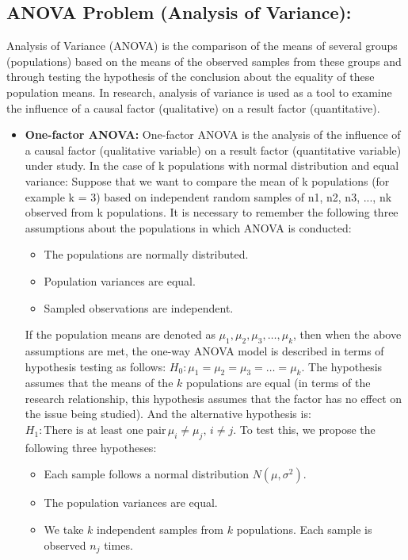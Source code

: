 \documentclass{article}
\begin{document}
	\subsection{ANOVA Problem (Analysis of Variance):}
	Analysis of Variance (ANOVA) is the comparison of the means of several groups (populations) based on the means of the observed samples from these groups and through testing the hypothesis of the conclusion about the equality of these population means. In research, analysis of variance is used as a tool to examine the influence of a causal factor (qualitative) on a result factor (quantitative).
	\begin{itemize}
		\item 
		\textbf{One-factor ANOVA:} One-factor ANOVA is the analysis of the influence of a causal factor (qualitative variable) on a result factor (quantitative variable) under study. In the case of k populations with normal distribution and equal variance: Suppose that we want to compare the mean of k populations (for example k = 3) based on independent random samples of n1, n2, n3, ..., nk observed from k populations. It is necessary to remember the following three assumptions about the populations in which ANOVA is conducted:
		\begin{itemize}
			\item The populations are normally distributed.
			\item Population variances are equal.
			\item Sampled observations are independent.
		\end{itemize}
		If the population means are denoted as \(\mu_1, \mu_2, \mu_3, \ldots, \mu_k\), then when the above assumptions are met, the one-way ANOVA model is described in terms of hypothesis testing as follows: \(H_0: \mu_1 = \mu_2 = \mu_3 = \ldots = \mu_k\). The hypothesis assumes that the means of the \(k\) populations are equal (in terms of the research relationship, this hypothesis assumes that the factor has no effect on the issue being studied). And the alternative hypothesis is: \(H_1: \text{There is at least one pair} \, \mu_i \neq \mu_j, \, i \neq j\). To test this, we propose the following three hypotheses:
		\begin{itemize}
			\item Each sample follows a normal distribution \( N(\mu, \sigma^2) \).
			\item The population variances are equal.
			\item We take \( k \) independent samples from \( k \) populations. Each sample is observed \( n_j \) times.

\end{itemize}
\end{itemize}
\end{document}
